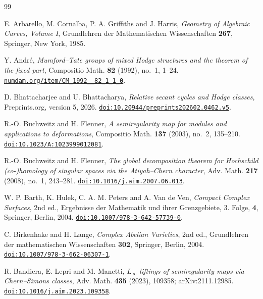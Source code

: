 \begin{thebibliography}{99}

E. Arbarello, M. Cornalba, P. A. Griffiths and J. Harris,
\emph{Geometry of Algebraic Curves, Volume I},
Grundlehren der Mathematischen Wissenschaften \textbf{267},
Springer, New York, 1985.

Y. Andr\'e,
\emph{Mumford--Tate groups of mixed Hodge structures and the theorem of the
fixed part},
Compositio Math. \textbf{82} (1992), no.~1, 1--24.
\href{http://www.numdam.org/item/CM_1992__82_1_1_0/}{\texttt{numdam.org/item/CM\_1992\_\_82\_1\_1\_0}}.

D. Bhattacharjee and U. Bhattacharya,
\emph{Relative secant cycles and Hodge classes},
Preprints.org, version 5, 2026.
\href{https://doi.org/10.20944/preprints202602.0462.v5}{\texttt{doi:10.20944/preprints202602.0462.v5}}.

R.-O. Buchweitz and H. Flenner,
\emph{A semiregularity map for modules and applications to deformations},
Compositio Math. \textbf{137} (2003), no.~2, 135--210.
\href{https://doi.org/10.1023/A:1023999012081}{\texttt{doi:10.1023/A:1023999012081}}.

R.-O. Buchweitz and H. Flenner,
\emph{The global decomposition theorem for Hochschild (co-)homology of
singular spaces via the Atiyah--Chern character},
Adv. Math. \textbf{217} (2008), no.~1, 243--281.
\href{https://doi.org/10.1016/j.aim.2007.06.013}{\texttt{doi:10.1016/j.aim.2007.06.013}}.

W. P. Barth, K. Hulek, C. A. M. Peters and A. Van de Ven,
\emph{Compact Complex Surfaces}, 2nd ed.,
Ergebnisse der Mathematik und ihrer Grenzgebiete, 3. Folge, \textbf{4},
Springer, Berlin, 2004.
\href{https://doi.org/10.1007/978-3-642-57739-0}{\texttt{doi:10.1007/978-3-642-57739-0}}.

C. Birkenhake and H. Lange,
\emph{Complex Abelian Varieties}, 2nd ed.,
Grundlehren der mathematischen Wissenschaften \textbf{302},
Springer, Berlin, 2004.
\href{https://doi.org/10.1007/978-3-662-06307-1}{\texttt{doi:10.1007/978-3-662-06307-1}}.

R. Bandiera, E. Lepri and M. Manetti,
\emph{$L_{\infty}$ liftings of semiregularity maps via Chern--Simons classes},
Adv. Math. \textbf{435} (2023), 109358; arXiv:2111.12985.
\href{https://doi.org/10.1016/j.aim.2023.109358}{\texttt{doi:10.1016/j.aim.2023.109358}}.


\end{thebibliography}
